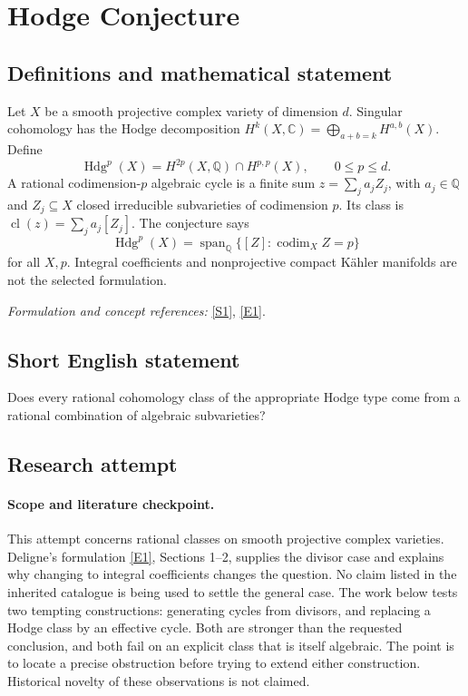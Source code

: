\documentclass[11pt]{article}
\begin{document}
\section*{\texorpdfstring{Hodge Conjecture}{Hodge Conjecture}}\label{statement}
\subsection{Definitions and mathematical statement}
Let $X$ be a smooth projective complex variety of dimension $d$. Singular cohomology has the Hodge decomposition $H^k(X,{\mathbb{C}})=\bigoplus_{a+b=k}H^{a,b}(X)$. Define
\[
 \operatorname{Hdg}^{p}(X)=H^{2p}(X,{\mathbb{Q}})\cap H^{p,p}(X),\qquad 0\le p\le d.
\]
A rational codimension-$p$ algebraic cycle is a finite sum $z=\sum_j a_j Z_j$, with $a_j\in{\mathbb{Q}}$ and $Z_j\subseteq X$ closed irreducible subvarieties of codimension $p$. Its class is $\operatorname{cl}(z)=\sum_j a_j[Z_j]$. The conjecture says
\[
 \operatorname{Hdg}^{p}(X)=\operatorname{span}_{{\mathbb{Q}}}\{[Z]:\operatorname{codim}_X Z=p\}
\]
for all $X,p$. Integral coefficients and nonprojective compact Kähler manifolds are not the selected formulation.
\par\smallskip\textit{Formulation and concept references:} \href{https://www.claymath.org/library/monographs/MPPc.pdf}{[S1]}, \href{https://www.claymath.org/wp-content/uploads/2022/06/hodge.pdf}{[E1]}.

\subsection{Short English statement}
Does every rational cohomology class of the appropriate Hodge type come from a rational combination of algebraic subvarieties?
\subsection{Research attempt}

\paragraph{Scope and literature checkpoint.}
This attempt concerns rational classes on smooth projective complex varieties.
Deligne's formulation \href{https://www.claymath.org/wp-content/uploads/2022/06/hodge.pdf}{[E1]}, Sections 1--2, supplies the divisor case and
explains why changing to integral coefficients changes the question. No claim
listed in the inherited catalogue is being used to settle the general case.
The work below tests two tempting constructions: generating cycles from
divisors, and replacing a Hodge class by an effective cycle. Both are stronger
than the requested conclusion, and both fail on an explicit class that is
itself algebraic. The point is to locate a precise obstruction before trying
to extend either construction. Historical novelty of these observations is
not claimed.
\end{document}
